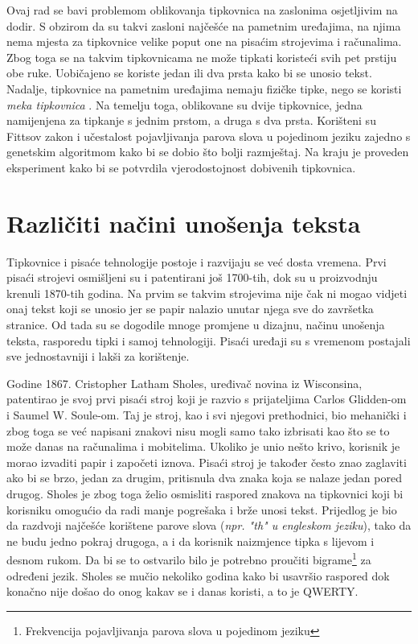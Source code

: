 \documentclass[times, utf8, zavrsni, numeric]{fer}
\begin{document}
Ovaj rad se bavi problemom oblikovanja tipkovnica na zaslonima osjetljivim na dodir. S obzirom da su takvi zasloni najčešće na pametnim uređajima, na njima nema mjesta za tipkovnice velike poput one na pisaćim strojevima i računalima. Zbog toga se na takvim tipkovnicama ne može tipkati koristeći svih pet prstiju obe ruke. Uobičajeno se koriste jedan ili dva prsta kako bi se unosio tekst. Nadalje, tipkovnice na pametnim uređajima nemaju fizičke tipke, nego se koristi \emph{meka tipkovnica} . Na temelju toga, oblikovane su dvije tipkovnice, jedna namijenjena za tipkanje s jednim prstom, a druga s dva prsta. Korišteni su Fittsov zakon i učestalost pojavljivanja parova slova u pojedinom jeziku zajedno s genetskim algoritmom kako bi se dobio što bolji razmještaj. Na kraju je proveden eksperiment kako bi se potvrdila vjerodostojnost dobivenih tipkovnica.


\chapter{Različiti načini unošenja teksta}

Tipkovnice i pisaće tehnologije postoje i razvijaju se već dosta vremena. Prvi pisaći strojevi osmišljeni su i patentirani još 1700-tih, dok su u proizvodnju krenuli 1870-tih godina. Na prvim se takvim strojevima nije čak ni mogao vidjeti onaj tekst koji se unosio jer se papir nalazio unutar njega sve do završetka stranice. Od tada su se dogodile mnoge promjene u dizajnu, načinu unošenja teksta, rasporedu tipki i samoj tehnologiji. Pisaći uređaji su s vremenom postajali sve jednostavniji i lakši za korištenje.

Godine 1867. Cristopher Latham Sholes, uređivač novina iz Wisconsina, patentirao je svoj prvi pisaći stroj koji je razvio s prijateljima Carlos Glidden-om i Saumel W. Soule-om. Taj je stroj, kao i svi njegovi prethodnici, bio mehanički i zbog toga se već napisani znakovi nisu mogli samo tako izbrisati kao što se to može danas na računalima i mobitelima. Ukoliko je unio nešto krivo, korisnik je morao izvaditi papir i započeti iznova. Pisaći stroj je također često znao zaglaviti ako bi se brzo, jedan za drugim, pritisnula dva znaka koja se nalaze jedan pored drugog. Sholes je zbog toga želio osmisliti raspored znakova na tipkovnici koji bi korisniku omogućio da radi manje pogrešaka i brže unosi tekst. Prijedlog je bio da razdvoji najčešće korištene parove slova (\emph{npr. "th" u engleskom jeziku}), tako da ne budu jedno pokraj drugoga, a i da korisnik naizmjence tipka s lijevom i desnom rukom. Da bi se to ostvarilo bilo je potrebno proučiti bigrame\footnote{Frekvencija pojavljivanja parova slova u pojedinom jeziku} za određeni jezik. Sholes se mučio nekoliko godina kako bi usavršio raspored dok konačno nije došao do onog kakav se i danas koristi, a to je QWERTY.
\end{document}
